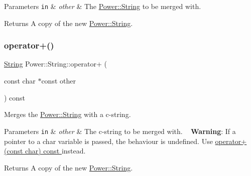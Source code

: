 \begin{DoxyParams}[1]{Parameters}
\mbox{\tt in}  & {\em other} & The \hyperlink{class_power_1_1_string}{Power\+::\+String} to be merged with. \\
\hline
\end{DoxyParams}
\begin{DoxyReturn}{Returns}
A copy of the new \hyperlink{class_power_1_1_string}{Power\+::\+String}. 
\end{DoxyReturn}
\mbox{\label{class_power_1_1_string_af34ca6369790db392b8a39e2149e5201}} 
\subsubsection{\texorpdfstring{operator+()}{operator+()}\hspace{0.1cm}{\footnotesize\ttfamily [2/11]}}
{\footnotesize\ttfamily \hyperlink{class_power_1_1_string}{String} Power\+::\+String\+::operator+ (\begin{DoxyParamCaption}\item[{const char $\ast$const}]{other }\end{DoxyParamCaption}) const\hspace{0.3cm}{\ttfamily [inline]}}



Merges the \hyperlink{class_power_1_1_string}{Power\+::\+String} with a c-\/string. 


\begin{DoxyParams}[1]{Parameters}
\mbox{\tt in}  & {\em other} & The c-\/string to be merged with. ~\newline
 {\bfseries Warning}\+: If a pointer to a char variable is passed, the behaviour is undefined. Use \hyperlink{class_power_1_1_string_ada2da9028cb2a4ebffc585a1da8a942f}{operator+(const char) const }instead. \\
\hline
\end{DoxyParams}
\begin{DoxyReturn}{Returns}
A copy of the new \hyperlink{class_power_1_1_string}{Power\+::\+String}. 
\end{DoxyReturn}
\mbox{\label{class_power_1_1_string_ada2da9028cb2a4ebffc585a1da8a942f}} 

